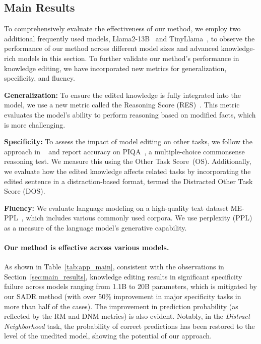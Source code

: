 \subsection{Main Results}
\label{app:main_results}
To comprehensively evaluate the effectiveness of our method, we employ two additional frequently used models, Llama2-13B~\citep{touvron2023llama} and TinyLlama~\citep{zhang2024tinyllama}, to observe the performance of our method across different model sizes and advanced knowledge-rich models in this section. 
To further validate our method's performance in knowledge editing, we have incorporated new metrics for generalization, specificity, and fluency.

\textbf{Generalization:} To ensure the edited knowledge is fully integrated into the model, we use a new metric called the Reasoning Score (RES)~\citep{yao2023editing}. This metric evaluates the model's ability to perform reasoning based on modified facts, which is more challenging. 

\textbf{Specificity:} To assess the impact of model editing on other tasks, we follow the approach in ~\citet{yao2023editing} and report accuracy on PIQA~\citep{bisk2020piqa}, a multiple-choice commonsense reasoning test. We measure this using the Other Task Score~(OS). Additionally, we evaluate how the edited knowledge affects related tasks by incorporating the edited sentence in a distraction-based format, termed the Distracted Other Task Score (DOS).

\textbf{Fluency:} We evaluate language modeling on a high-quality text dataset ME-PPL~\citep{yang2024butterfly}, which includes various commonly used corpora. We use perplexity (PPL) as a measure of the language model's generative capability.




\paragraph{Our method is effective across various models.} As shown in Table~\ref{tab:app_main}, consistent with the observations in Section~\ref{sec:main_results}, knowledge editing results in significant specificity failure across models ranging from 1.1B to 20B parameters, which is mitigated by our SADR method (with over 50\% improvement in major specificity tasks in more than half of the cases). 
The improvement in prediction probability (as reflected by the RM and DNM metrics) is also evident.
Notably, in the \textit{Distract Neighborhood} task, the probability of correct predictions has been restored to the level of the unedited model, showing the potential of our approach.

